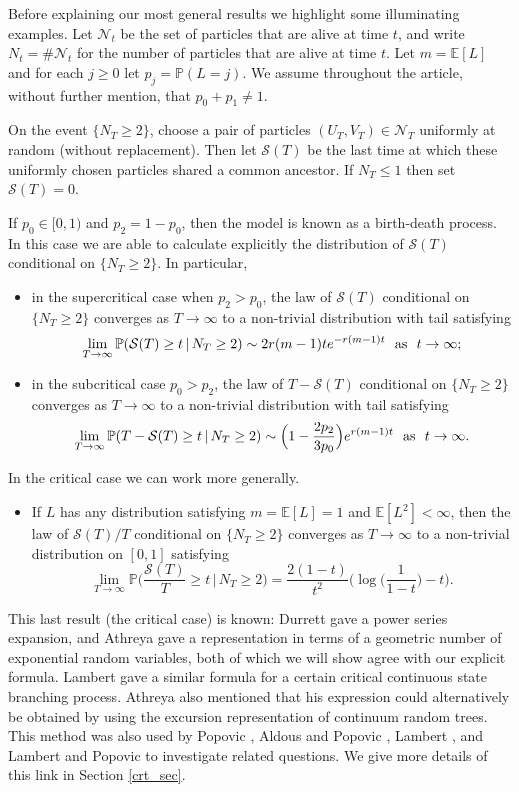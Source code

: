 \documentclass{article}
\theoremstyle{plain}
\theoremstyle{definition}
\renewcommand{\P}{\mathbb{P}}
\newcommand{\E}{\mathbb{E}}
\newcommand{\Nc}{\mathcal{N}}
\renewcommand{\S}{\mathcal{S}}
\begin{document}
Before explaining our most general results we highlight some illuminating examples. Let $\Nc_t$ be the set of particles that are alive at time $t$, and write $N_t = \#\Nc_t$ for the number of particles that are alive at time $t$. Let $m=\E[L]$ and for each $j\ge0$ let $p_j = \P(L=j)$. We assume throughout the article, without further mention, that $p_0+p_1\neq 1$.

On the event $\{N_T\ge 2\}$, choose a pair of particles $(U_T,V_T)\in\Nc_T$ uniformly at random (without replacement). Then let $\S(T)$ be the last time at which these uniformly chosen particles shared a common ancestor. If $N_T \le 1$ then set $\S(T)=0$.

If $p_0\in[0,1)$ and $p_2=1-p_0$, then the model is known as a birth-death process. In this case we are able to calculate explicitly the distribution of $\S(T)$ conditional on $\{N_T\ge 2\}$. In particular,
\begin{itemize}
\item in the supercritical case when $p_2>p_0$, the law of $\S(T)$ conditional on $\{N_T\ge 2\}$ converges as $T\to\infty$ to a non-trivial distribution with tail satisfying
\[\lim_{T\to\infty}\P(\S(T) \ge t\,|\,N_T\ge 2)\sim 2r(m-1)t e^{-r(m-1)t} \,\,\hbox{ as }\,\, t\to\infty;\]
\item in the subcritical case $p_0>p_2$, the law of $T-\S(T)$ conditional on $\{N_T\ge 2\}$ converges as $T\to\infty$ to a non-trivial distribution with tail satisfying
\[\lim_{T\to\infty}\P(T-\S(T) \ge t\,|\,N_T\ge 2)\sim \Big(1-\frac{2p_2}{3p_0}\Big)e^{r(m-1)t} \,\,\hbox{ as }\,\, t\to\infty. \]
\end{itemize}

\noindent
In the critical case we can work more generally.
\begin{itemize}
\item If $L$ has any distribution satisfying $m=\E[L]=1$ and $\E[L^2]<\infty$, then the law of $\S(T)/T$ conditional on $\{N_T\ge 2\}$ converges as $T\to\infty$ to a non-trivial distribution on $[0,1]$ satisfying
\[\lim_{T\to\infty}\P\Big(\frac{\S(T)}{T} \ge t\,\Big|\,N_T\ge 2\Big) = \frac{2(1-t)}{t^2}\Big(\log\Big(\frac{1}{1-t}\Big) - t\Big).\]
\end{itemize}
This last result (the critical case) is known: Durrett \cite{durrett:genealogy} gave a power series expansion, and Athreya \cite{athreya:coalescence} gave a representation in terms of a geometric number of exponential random variables, both of which we will show agree with our explicit formula. Lambert \cite{lambert:coalescence_GW} gave a similar formula for a certain critical continuous state branching process. Athreya also mentioned that his expression could alternatively be obtained by using the excursion representation of continuum random trees. This method was also used by Popovic \cite{popovic:asymptotic_genealogy_critical_bp}, Aldous and Popovic \cite{aldous_popovic:critical_bp_biodiversity}, Lambert \cite{lambert:contour_splitting_trees}, and Lambert and Popovic \cite{lambert:coalescent_branching_trees} to investigate related questions. We give more details of this link in Section \ref{crt_sec}.
\end{document}
